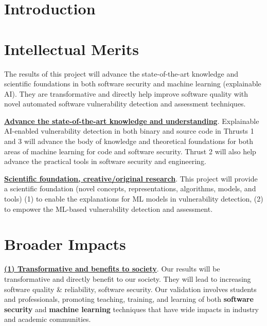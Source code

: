 \section{Introduction}\label{sec:intro}



%





\section{Intellectual Merits}

The results of this project will advance the state-of-the-art
knowledge and scientific foundations in both software security and
machine learning (explainable AI). They are transformative and
directly help improve software quality with novel automated software
vulnerability detection and assessment techniques.

\noindent \underline{{\bf Advance the state-of-the-art knowledge and
    understanding}}. Explainable AI-enabled vulnerability detection in
both binary and source code in Thrusts 1 and 3 will advance the body
of knowledge and theoretical foundations for both areas of machine
learning for code and software security. Thrust 2 will also help
advance the practical tools in software security and engineering.

\noindent \underline{{\bf Scientific foundation, creative/original
    research}}. This project will provide a scientific foundation
(novel concepts, representations, algorithms, models, and tools) (1)
to enable the explanations for ML models in vulnerability detection,
(2) to empower the ML-based vulnerability detection and assessment.


\section{Broader Impacts}

\underline{{\bf (1) Transformative and benefits to society}}. Our
results will be transformative and directly benefit to our society.
They will lead to increasing software quality \& reliability, software
security.  Our validation involves students and professionals,
promoting teaching, training, and learning of both {\bf software
  security} and {\bf machine learning} techniques that have wide
impacts in industry and academic communities.


